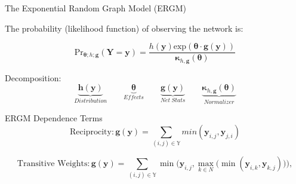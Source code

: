 \documentclass{beamer}
\newcommand{\bt}{\pmb{\theta}}
\begin{document}
\begin{frame}{The Exponential Random Graph Model (ERGM)}

The probability (likelihood function) of observing the network is:

$$ \text{Pr}_{\bm{\theta};h;\bm{g}}( \bm{Y}=\bm{y} )=\frac{ h(\bm{y})\text{exp}( \bm{\theta} \cdot \bm{g} (\bm{y}) )}{\bm{\kappa}_{h,\bm{g}}(\bm{\theta})} $$


Decomposition:
$$
\underbrace{\bm{h(y)}}_{Distribution} \qquad \underbrace{\bt}_{Effects} \qquad \underbrace{\bm{g(y)}}_{Net\hspace{3pt} Stats} \qquad \underbrace{\bm{\kappa}_{h,\bm{g}}(\bm{\theta})} _{Normalizer}
$$



\end{frame}

\begin{frame}{ERGM Dependence Terms}
$$ \text{Reciprocity}: \bm{g(y)} = \sum_{(i,j) {\in} \mathbb{Y}}min(\bm{y}_{i,j},\bm{y}_{j,i})$$

$$\text{Transitive Weights}: \bm{g(y)} =  \sum_{(i,j) {\in} \mathbb{Y}}\min\bigg( \bm{y}_{i,j}, \max\limits_{k{\in}N}\Big(\min(\bm{y}_{i,k},\bm{y}_{k,j})\Big) \bigg),$$ 


\end{frame}
\end{document}
